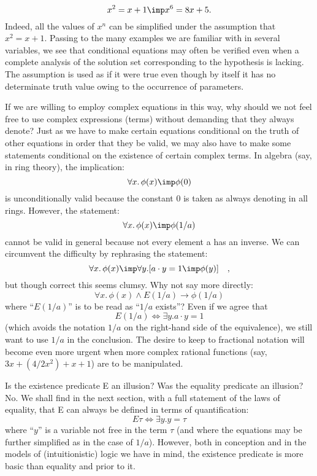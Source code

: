 $$
x^2 = x + 1 \imp x^6 = 8x + 5.
$$
Indeed, all the values of $x^n$ can be simplified under the assumption that $x^2 =
x + 1$. Passing to the many examples we are familiar with in several variables,
we see that conditional equations may often be verified even when a complete analysis
of the solution set corresponding to the hypothesis is lacking. The assumption
is used as if it were true even though by itself it has no determinate truth value 
owing to the occurrence of parameters.

If we are willing to employ complex equations in this way, why should we not feel 
free to use complex expressions (terms) without demanding that they always denote? Just as we have to make certain equations conditional on the truth of
other equations in order that they be valid, we may also have to make some 
statements conditional on the existence of certain complex terms. In algebra (say, in ring theory), the implication:
$$
\forall x.\, \phi(x) \imp \phi(0)
$$
is unconditionally valid because the constant 0 is taken as always denoting in
all rings. However, the statement:
$$
\forall x.\, \phi(x) \imp \phi(1/a)
$$
cannot be valid in general because not every element a has an inverse. We can circumvent the difficulty by rephrasing the statement:
$$
\forall x.\, \phi(x) \imp \forall y. [ a \cdot y = 1 \imp \phi(y) ] \quad,
$$
but though correct this seems clumsy. Why not say more directly:
$$
\forall x.\, \phi(x) \land E(1/a) \to \phi(1/a)
$$
where ``$E(1/a)$'' is to be read as ``$1/a$ exists''? Even if we agree that
$$
E(1/a) \iff \exists y. a \cdot y = 1
$$
(which avoids the notation $1/a$ on the right-hand side of the equivalence), we still want to use $1/a$ in the conclusion. 
The desire to keep to fractional notation will become even more urgent when more complex rational functions 
(say, $3x + (4 / 2x^2) + x + 1$) are to be manipulated.

Is the existence predicate E an illusion? Was the equality predicate an illusion? No. We shall find in the next section, with a full statement of the laws of equality, that E can always be defined in terms of quantification:
$$
E\tau \iff \exists y.y = \tau
$$
where ``$y$'' is a variable not free in the term $\tau$ (and where the equations may be further 
simplified as in the case of $1/a$). However, both in conception and in the models of (intuitionistic) 
logic we have in mind, the existence predicate is more basic than equality and prior to it.

